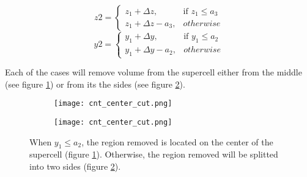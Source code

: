 \documentclass[a4paper,12pt]{report}
\begin{document}
\[
z2=
\begin{cases}
z_1+\Delta z, & \text{if } z_1 \leq a_3 \\
z_1+\Delta z-a_3, & otherwise
\end{cases}
\]
\[
y2=
\begin{cases}
y_1+\Delta y, & \text{if } y_1 \leq a_2 \\
y_1+\Delta y-a_2, & otherwise
\end{cases}
\]

 Each of the cases will remove volume from the supercell either from the middle (see figure 
 \ref{fig:vcutcenter}) or from its the sides (see figure \ref{fig:vcutsides}).

\begin{figure}[h]
    \centering
    \begin{subfigure}{.5\textwidth}
        \centering
        \texttt{[image: cnt\_center\_cut.png]} 
        \label{fig:vcutcenter}
        \caption{}
    \end{subfigure}%
    \begin{subfigure}{.5\textwidth}
        \centering
        \texttt{[image: cnt\_center\_cut.png]} 
        \label{fig:vcutsides}
        \caption{}
    \end{subfigure}
    \caption{When \(y_1 \leq a_2\), the region removed is located on the center of the supercell
    (figure \ref{fig:vcutcenter}). Otherwise, the region removed will be splitted into two sides (figure \ref{fig:vcutsides}).}
    \label{fig:vcut}
\end{figure}













\newpage
\end{document}
